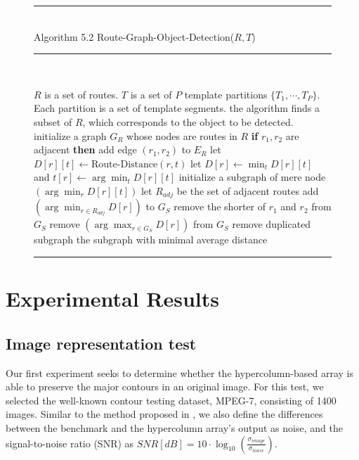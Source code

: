 \documentclass[journal]{IEEEtran}
\newenvironment{myalgorithm}[1]%
{\begin{figure}[!h]\small\noindent\rule{\linewidth}{1pt}\\#1\vspace{-0.5em}\\%
\rule{\linewidth}{0.5pt}\\\vspace{-1.5em}}%
{\vspace{-0.5em}\rule{\linewidth}{1pt}\end{figure}}
\begin{document}
\begin{myalgorithm}{Algorithm 5.2 Route-Graph-Object-Detection($R,T$)}
\begin{algorithmic}[1]
\REQUIRE $R$ is a set of routes. $T$ is a set of $P$ template partitions
$\{T_1,\cdots,T_P\}$. Each partition is a set of template segments.
\ENSURE the algorithm finds a subset of $R$, which corresponds to the object to be detected.
\STATE initialize a graph $G_R$ whose nodes are routes in $R$
  \STATE \textbf{if} $r_1,r_2$ are adjacent \textbf{then} add edge $(r_1,r_2)$ to $E_R$
\ENDFOR
{}
    \STATE let $D[r][t]\leftarrow\text{Route-Distance}(r,t)$
  \ENDFOR
    \STATE let $D[r]\leftarrow\min_t D[r][t]$ and $t[r]\leftarrow\arg\min_t D[r][t]$
  \ENDFOR
    \STATE initialize a subgraph of mere node $(\arg\min_r D[r][t])$
  \ENDFOR
  \REPEAT
      \STATE let $R_{adj}$ be the set of adjacent routes
        \STATE add $(\arg\min_{r\in R_{adj}}D[r])$ to $G_S$
      \ENDIF
        \STATE remove the shorter of $r_1$ and $r_2$ from $G_S$
      \ENDIF
        \STATE remove $(\arg\max_{r\in G_S}D[r])$ from $G_S$
      \ENDIF
    \ENDFOR
    \STATE remove duplicated subgraph
\ENDFOR
\RETURN the subgraph with minimal average distance
\end{algorithmic}
\end{myalgorithm}

\section{Experimental Results}

\subsection{Image representation test}

Our first experiment seeks to determine whether the hypercolumn-based array is able to preserve the major contours in an original image. 
For this test, we selected the well-known contour testing dataset, MPEG-7, consisting of 1400 images. 
Similar to the method proposed in \cite{russ1995}, 
we also define the differences between the benchmark and the hypercolumn array's output as noise, 
and the signal-to-noise ratio (SNR) as $SNR[dB]=10\cdot\log_10(\frac{\sigma_{image}}{\sigma_{noise}})$.
\end{document}

